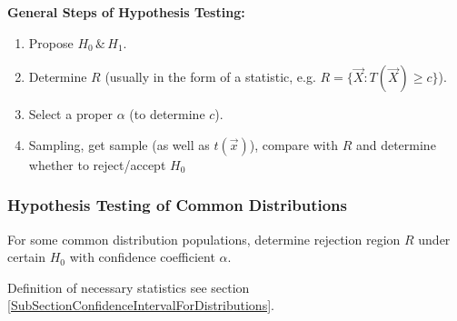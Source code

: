         \begin{point}
            \textbf{General Steps of Hypothesis Testing:}
        \end{point}
        
        

        \begin{enumerate}[topsep=0pt]
            \item Propose $H_0\,\&\, H_1$.
            \item Determine $R$ (usually in the form of a statistic, e.g. $R=\{\vec{X}:T(\vec{X})\geq c\}$).
            \item Select a proper $\alpha$ (to determine $c$).
            \item Sampling, get sample (as well as $t(\vec{x})$), compare with $R$ and determine whether to reject/accept $H_0$
        \end{enumerate}

        



\subsubsection{Hypothesis Testing of Common Distributions}\label{SubSectionHypothesisTestingOfCommonDistributions}
    For some common distribution populations, determine rejection region $R$ under certain $H_0$ with confidence coefficient $\alpha$.

    Definition of necessary statistics see section \hyperref[SubSectionConfidenceIntervalForDistributions]{\ref{SubSectionConfidenceIntervalForDistributions}}.


